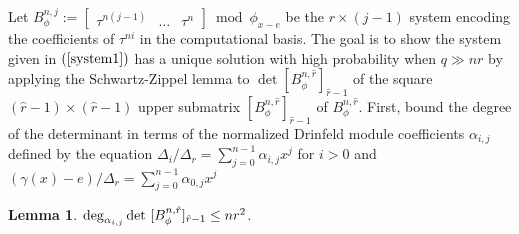 \documentclass[sigconf]{acmart}
\newtheorem{lemma}{Lemma}
\newcommand{\hatr}{\hat{r}}
\begin{document}
Let $B_{\phi}^{n,j} := \begin{bmatrix} \tau^{n(j-1)} & \ldots & \tau^{n} \end{bmatrix} \bmod \phi_{x-e}$ be the $r \times (j -1)$ system encoding the coefficients of $\tau^{ni}$ in the computational basis. The goal is to show the system given in $(\ref{system1})$ has a unique solution with high probability when $q \gg nr$ by applying the Schwartz-Zippel lemma to $\det [B_{\phi}^{n,\hatr}]_{\hatr-1}$ of the square $(\hatr - 1) \times (\hatr - 1)$ upper submatrix $[B_{\phi}^{n,\hatr}]_{\hatr-1}$ of $B_{\phi}^{n,\hatr}$. First, bound the degree of the determinant in terms of the normalized Drinfeld module coefficients $\alpha_{i,j}$ defined by the equation $ \Delta_i/\Delta_r = \sum_{j=0}^{n-1}\alpha_{i,j}x^j$ for $i > 0$ and $ (\gamma(x) - e)/\Delta_r = \sum_{j=0}^{n-1}\alpha_{0,j}x^j$

\begin{lemma}
$\deg_{\alpha_{i,j}} \textnormal{det }  [B_{\phi}^{n,\hatr}]_{\hatr-1}\leq nr^2$.
\end{lemma}
\end{document}
